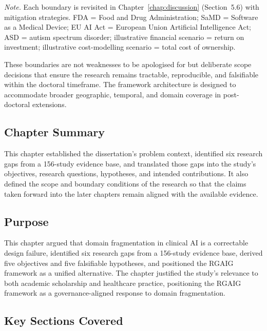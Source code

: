\vspace{0.5em}
\noindent\textit{Note.} Each boundary is revisited in Chapter~\ref{chap:discussion} (Section~5.6) with mitigation strategies. FDA = Food and Drug Administration; SaMD = Software as a Medical Device; EU AI Act = European Union Artificial Intelligence Act; ASD = autism spectrum disorder;   illustrative financial scenario = return on investment; illustrative cost-modelling scenario = total cost of ownership.
\fi %


\noindent These boundaries are not weaknesses to be apologised for but deliberate scope decisions that ensure the research remains tractable, reproducible, and falsifiable within the doctoral timeframe. The framework architecture is designed to accommodate broader geographic, temporal, and domain coverage in post-doctoral extensions.

\subsection{Chapter Summary}
\label{sec:ch1_conclusion}

This chapter established the dissertation's problem context, identified six research gaps from a 156-study evidence base, and translated those gaps into the study's objectives, research questions, hypotheses, and intended contributions. It also defined the scope and boundary conditions of the research so that the claims taken forward into the later chapters remain aligned with the available evidence.

\iffalse %
\subsection{Purpose}

This chapter argued that domain fragmentation in clinical AI is a correctable design failure, identified six research gaps from a 156-study evidence base, derived five objectives and five falsifiable hypotheses, and positioned the RGAIG framework as a unified alternative. The chapter justified the study's relevance to both academic scholarship and healthcare practice, positioning the RGAIG framework as a governance-aligned response to domain fragmentation.

\subsection{Key Sections Covered}


